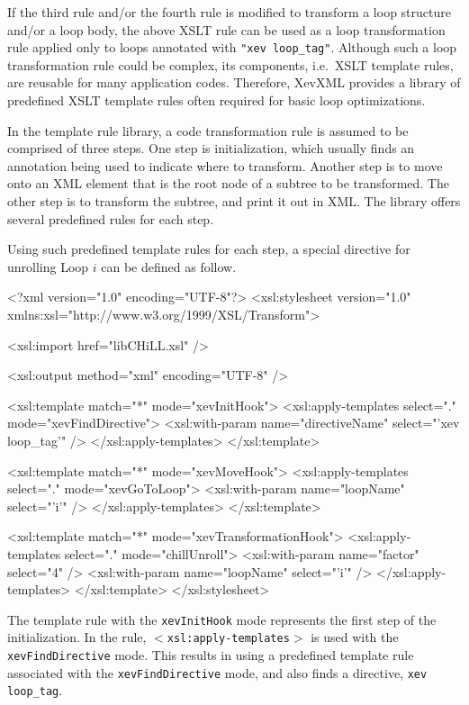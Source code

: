 If the third rule and/or the fourth rule is modified to transform a loop
structure and/or a loop body, the above XSLT rule can be used as a loop
transformation rule applied only to loops annotated with \texttt{"xev
loop\_tag"}. Although such a loop transformation rule could be complex,
its components, i.e.~XSLT template rules, are reusable for many
application codes.  Therefore, XevXML provides a library of predefined
XSLT template rules often required for basic loop optimizations.


In the template rule library, a code transformation rule is assumed to
be comprised of three steps. One step is initialization, which usually
finds an annotation being used to indicate where to transform. Another
step is to move onto an XML element that is the root node of a subtree
to be transformed. The other step is to transform the subtree, and print
it out in XML. The library offers several predefined rules for each
step.

Using such predefined template rules for each step, a special directive
for unrolling Loop $i$ can be defined as follow.
\begin{framed}
 \begin{src}
<?xml version="1.0" encoding="UTF-8"?>
  <xsl:stylesheet version="1.0"
  xmlns:xsl="http://www.w3.org/1999/XSL/Transform">

  <xsl:import href="libCHiLL.xsl" />

  <xsl:output method="xml" encoding="UTF-8" />

  <xsl:template match="*" mode="xevInitHook">
   <xsl:apply-templates select="." mode="xevFindDirective">
      <xsl:with-param name="directiveName" select="'xev loop_tag'" />
    </xsl:apply-templates>
  </xsl:template>

  <xsl:template match="*" mode="xevMoveHook">
    <xsl:apply-templates select="." mode="xevGoToLoop">
      <xsl:with-param name="loopName" select="'i'" />
    </xsl:apply-templates>
  </xsl:template>

  <xsl:template match="*" mode="xevTransformationHook">
    <xsl:apply-templates select="." mode="chillUnroll">
      <xsl:with-param name="factor" select="4" />
      <xsl:with-param name="loopName" select="'i'" />
    </xsl:apply-templates>
  </xsl:template>
</xsl:stylesheet>
\end{src}
\end{framed}

The template rule with the \texttt{xevInitHook} mode represents the
first step of the initialization. In the rule,
\texttt{$<$xsl:apply-templates$>$} is used with the
\texttt{xevFindDirective} mode. This results in using a predefined
template rule associated with the \texttt{xevFindDirective} mode, and
also finds a directive, \texttt{xev loop\_tag}.

